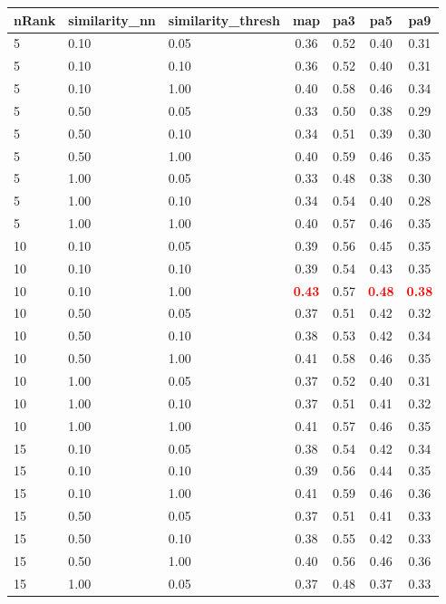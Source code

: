   
\begin{table} 
\begin{center} 
\scriptsize 
 \setlength{\tabcolsep}{.16667em} 
\begin{tabular}{lllcccc} 
nRank & similarity\_nn & similarity\_thresh & map & pa3 & pa5 & pa9 \\ 
\hline 
 5 & 0.10 & 0.05 & 0.36 & 0.52 & 0.40 & 0.31 \\ 
 5 & 0.10 & 0.10 & 0.36 & 0.52 & 0.40 & 0.31 \\ 
 5 & 0.10 & 1.00 & 0.40 & 0.58 & 0.46 & 0.34 \\ 
 5 & 0.50 & 0.05 & 0.33 & 0.50 & 0.38 & 0.29 \\ 
 5 & 0.50 & 0.10 & 0.34 & 0.51 & 0.39 & 0.30 \\ 
 5 & 0.50 & 1.00 & 0.40 & 0.59 & 0.46 & 0.35 \\ 
 5 & 1.00 & 0.05 & 0.33 & 0.48 & 0.38 & 0.30 \\ 
 5 & 1.00 & 0.10 & 0.34 & 0.54 & 0.40 & 0.28 \\ 
 5 & 1.00 & 1.00 & 0.40 & 0.57 & 0.46 & 0.35 \\ 
10 & 0.10 & 0.05 & 0.39 & 0.56 & 0.45 & 0.35 \\ 
10 & 0.10 & 0.10 & 0.39 & 0.54 & 0.43 & 0.35 \\ 
10 & 0.10 & 1.00 & \textbf{\textcolor{red}{0.43}} & 0.57 & \textbf{\textcolor{red}{0.48}} & \textbf{\textcolor{red}{0.38}} \\ 
10 & 0.50 & 0.05 & 0.37 & 0.51 & 0.42 & 0.32 \\ 
10 & 0.50 & 0.10 & 0.38 & 0.53 & 0.42 & 0.34 \\ 
10 & 0.50 & 1.00 & 0.41 & 0.58 & 0.46 & 0.35 \\ 
10 & 1.00 & 0.05 & 0.37 & 0.52 & 0.40 & 0.31 \\ 
10 & 1.00 & 0.10 & 0.37 & 0.51 & 0.41 & 0.32 \\ 
10 & 1.00 & 1.00 & 0.41 & 0.57 & 0.46 & 0.35 \\ 
15 & 0.10 & 0.05 & 0.38 & 0.54 & 0.42 & 0.34 \\ 
15 & 0.10 & 0.10 & 0.39 & 0.56 & 0.44 & 0.35 \\ 
15 & 0.10 & 1.00 & 0.41 & 0.59 & 0.46 & 0.36 \\ 
15 & 0.50 & 0.05 & 0.37 & 0.51 & 0.41 & 0.33 \\ 
15 & 0.50 & 0.10 & 0.38 & 0.55 & 0.42 & 0.33 \\ 
15 & 0.50 & 1.00 & 0.40 & 0.56 & 0.46 & 0.36 \\ 
15 & 1.00 & 0.05 & 0.37 & 0.48 & 0.37 & 0.33 \\ 

\end{tabular}
\end{center}
\end{table}
